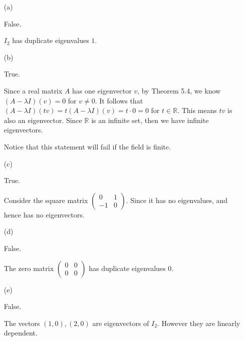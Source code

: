 \begin{Exercise}
	\begin{enumerate}[(a)]
		\item[(a)]
		\begin{answer}
			False.
		\end{answer}
		\begin{solution}
			$I_2$ has duplicate eigenvalues $1$.
		\end{solution}
		
		\item[(b)]
		\begin{answer}
			True.
		\end{answer}
		\begin{solution}
			Since a real matrix $A$ has one eigenvector $v$, by Theorem 5.4, we know $(A-\lambda I)(v) = 0$ for $v\neq 0$. It follows that $(A-\lambda I)(t v) = t(A-\lambda I)(v) = t\cdot 0 = 0$ for $t\in\mathbb{R}$. This means $t v$ is also an eigenvector. Since $\mathbb{R}$ is an infinite set, then we have infinite eigenvectors. 
			
			Notice that this statement will fail if the field is finite.
		\end{solution}
		
		\item[(c)]
		\begin{answer}
			True.
		\end{answer}
		\begin{solution}
			Consider the square matrix $\begin{pmatrix}
			0 & 1 \\
			-1 & 0
			\end{pmatrix}$. Since it has no eigenvalues, and hence has no eigenvectors.
		\end{solution}
		
		\item[(d)]
		\begin{answer}
			False.
		\end{answer}
		\begin{solution}
			The zero matrix $\begin{pmatrix}
			0 & 0 \\
			0 & 0
			\end{pmatrix}$ has duplicate eigenvalues $0$.
		\end{solution}
		
		\item[(e)]
		\begin{answer}
			False.
		\end{answer}
		\begin{solution}
			The vectors $(1,0),(2,0)$ are eigenvectors of $I_2$. However they are linearly dependent.
		\end{solution}
		

\end{enumerate}
\end{Exercise}
